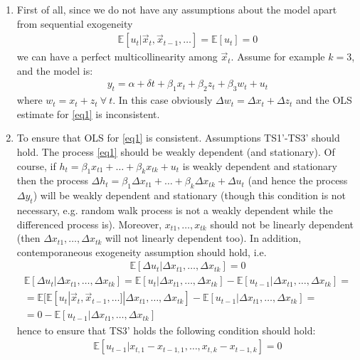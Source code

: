 \documentclass[a4paper]{article}
\newcommand{\expect}{\mathbb{E}}
\begin{document}
\begin{enumerate}
	\item First of all, since we do not have any assumptions about the model apart from sequential exogeneity
	\begin{align*}
	\expect[u_t|\vec{x}_t, \vec{x}_{t-1}, \dots] = \expect[u_t] = 0
	\end{align*}
	we can have a perfect multicollinearity among $\vec{x}_t$. Assume for example $k = 3$, and the model is:
	\begin{align*}
	y_t =\alpha + \delta t + \beta_1 x_t + \beta_2 z_t + \beta_3 w_t + u_t
	\end{align*} 
	where $w_t = x_t + z_t\ \forall\ t$. In this case obviously $\Delta w_t = \Delta x_t + \Delta z_t$ and the OLS estimate for \eqref{eq1} is inconsistent.
	\item To ensure that OLS for \eqref{eq1} is consistent. Assumptions TS1'-TS3' should hold. The process \eqref{eq1} should be weakly dependent (and stationary). Of course, if $h_t = \beta_1 x_{t1} + \dots + \beta_k x_{tk} + u_t$ is weakly dependent and stationary then the process $\Delta h_t = \beta_1 \Delta x_{t1} + \dots + \beta_k \Delta x_{tk} + \Delta u_t$ (and hence the process $\Delta y_t$) will be weakly dependent and stationary (though this condition is not necessary, e.g. random walk process is not a weakly dependent while the differenced process is). Moreover, $x_{t1}, \dots, x_{tk}$ should not be linearly dependent (then $\Delta x_{t1}, \dots, \Delta x_{tk}$ will not linearly dependent too). In addition, contemporaneous exogeneity assumption should hold, i.e.
	\begin{align*}
	\expect[\Delta u_t| \Delta x_{t1}, \dots, \Delta x_{tk}] = 0
	\end{align*} 
	\begin{align*}
	\expect[\Delta u_t|\Delta x_{t1}, \dots, \Delta x_{tk}] = \expect[u_{t}|\Delta x_{t1}, \dots, \Delta x_{tk}] - \expect[u_{t-1}|\Delta x_{t1}, \dots, \Delta x_{tk}] = \\
	=\expect[\expect[u_t|\vec{x}_{t}, \vec{x}_{t-1}, \dots]|\Delta x_{t1}, \dots, \Delta x_{tk}] - \expect[u_{t-1}|\Delta x_{t1}, \dots, \Delta x_{tk}] = \\
	=0 - \expect[u_{t-1}|\Delta x_{t1}, \dots, \Delta x_{tk}]
	\end{align*}
	hence to ensure that TS3' holds the following condition should hold:
	\begin{align*}
	\expect[u_{t-1}|x_{t,1} - x_{t-1, 1}, \dots, x_{t, k} - x_{t-1, k}] = 0
	\end{align*}

\end{enumerate}
\end{document}
